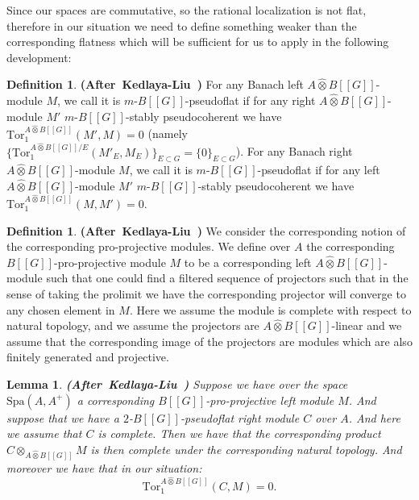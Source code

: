 \documentclass[12pt]{amsart}
\newtheorem{lemma}[theorem]{Lemma}
\theoremstyle{definition}
\newtheorem{definition}[theorem]{Definition}
\numberwithin{equation}{section}
\begin{document}
\indent Since our spaces are commutative, so the rational localization is not flat, therefore in our situation we need to define something weaker than the corresponding flatness which will be sufficient for us to apply in the following development: 

\begin{definition}\mbox{\bf{(After Kedlaya-Liu \cite[Definition 2.4.4]{KL2})}}
For any Banach left $A\widehat{\otimes}B[[G]]$-module $M$, we call it is $m$-$B[[G]]$-pseudoflat if for any right $A\widehat{\otimes}B[[G]]$-module $M'$ $m$-$B[[G]]$-stably pseudocoherent we have $\mathrm{Tor}_1^{A\widehat{\otimes}B[[G]]}(M',M)=0$ (namely $\{\mathrm{Tor}_1^{A\widehat{\otimes}B[[G]]/E}(M'_E,M_E)\}_{E\subset G}=\{0\}_{E\subset G}$). For any Banach right $A\widehat{\otimes}B[[G]]$-module $M$, we call it is $m$-$B[[G]]$-pseudoflat if for any left $A\widehat{\otimes}B[[G]]$-module $M'$ $m$-$B[[G]]$-stably pseudocoherent we have $\mathrm{Tor}_1^{A\widehat{\otimes}B[[G]]}(M,M')=0$.
\end{definition}





\begin{definition}\mbox{\bf{(After Kedlaya-Liu \cite[Definition 2.4.6]{KL2})}} We consider the corresponding notion of the corresponding pro-projective modules. We define over $A$ the corresponding $B[[G]]$-pro-projective module $M$ to be a corresponding left $A\widehat{\otimes}B[[G]]$-module such that one could find a filtered sequence of projectors such that in the sense of taking the prolimit we have the corresponding projector will converge to any chosen element in $M$. Here we assume the module is complete with respect to natural topology, and we assume the projectors are $A\widehat{\otimes}B[[G]]$-linear and we assume that the corresponding image of the projectors are modules which are also finitely generated and projective.
	
\end{definition}




\begin{lemma}\mbox{\bf{(After Kedlaya-Liu \cite[Lemma 2.4.7]{KL2})}}
Suppose we have over the space $\mathrm{Spa}(A,A^+)$ a corresponding $B[[G]]$-pro-projective left module $M$. And suppose that we have a $2$-$B[[G]]$-pseudoflat right module $C$ over $A$. And here we assume that $C$ is complete. Then we have that the corresponding product $C{\otimes}_{A\widehat{\otimes}B[[G]]}M$ is then complete under the corresponding natural topology. And moreover we have that in our situation:
\begin{displaymath}
\mathrm{Tor}_1^{A\widehat{\otimes}B[[G]]}(C,M)=0.	
\end{displaymath}

\end{lemma}
\end{document}
